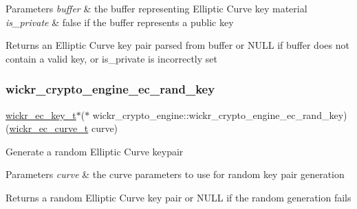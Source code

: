 \begin{DoxyParams}{Parameters}
{\em buffer} & the buffer representing Elliptic Curve key material \\
\hline
{\em is\+\_\+private} & false if the buffer represents a public key \\
\hline
\end{DoxyParams}
\begin{DoxyReturn}{Returns}
an Elliptic Curve key pair parsed from buffer or N\+U\+LL if buffer does not contain a valid key, or is\+\_\+private is incorrectly set 
\end{DoxyReturn}
\mbox{\label{group__wickr__crypto__engine_gad16b229b7d16cf00d3983c277ee3b88b}} 
\subsubsection{\texorpdfstring{wickr\+\_\+crypto\+\_\+engine\+\_\+ec\+\_\+rand\+\_\+key}{wickr\_crypto\_engine\_ec\_rand\_key}}
{\footnotesize\ttfamily \mbox{\hyperlink{structwickr__ec__key}{wickr\+\_\+ec\+\_\+key\+\_\+t}}$\ast$($\ast$ wickr\+\_\+crypto\+\_\+engine\+::wickr\+\_\+crypto\+\_\+engine\+\_\+ec\+\_\+rand\+\_\+key) (\mbox{\hyperlink{structwickr__ec__curve}{wickr\+\_\+ec\+\_\+curve\+\_\+t}} curve)}

Generate a random Elliptic Curve keypair


\begin{DoxyParams}{Parameters}
{\em curve} & the curve parameters to use for random key pair generation \\
\hline
\end{DoxyParams}
\begin{DoxyReturn}{Returns}
a random Elliptic Curve key pair or N\+U\+LL if the random generation fails 
\end{DoxyReturn}
\mbox{\label{group__wickr__crypto__engine_gac5a36d2a53e06a75a2b818e6a5cc96a1}} 
